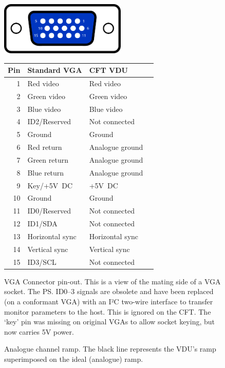 \begin{figure}
  \centering
  \includegraphics[width=6cm]{figs/DE15_Connector_Pinout.pdf}
  \vspace{1em}\par

  \zebra
  \begin{tabular}{rlll}
    Pin & Standard VGA & CFT VDU \\
    \hline
    1  & Red video & Red video \\
    2  & Green video & Green video \\
    3  & Blue video & Blue video \\
    4  & ID2/Reserved & Not connected \\
    5  & Ground & Ground \\
    6  & Red return & Analogue ground \\
    7  & Green return & Analogue ground \\
    8  & Blue return & Analogue ground \\
    9  & Key/+5V~DC & +5V~DC \\
    10 & Ground & Ground \\
    11 & ID0/Reserved & Not connected \\
    12 & ID1/SDA & Not connected \\
    13 & Horizontal sync & Horizontal sync \\
    14 & Vertical sync & Vertical sync \\
    15 & ID3/SCL & Not connected \\
    \hline
  \end{tabular}
  \caption[VGA Connector Pin-Out]{\label{fig:vdu-vga-pinout}VGA Connector
    pin-out. This is a view of the mating side of a VGA socket. The \ps{ID0–3}
    signals are obsolete and have been replaced (on a conformant VGA) with an
    I²C two-wire interface to transfer monitor parameters to the host. This is
    ignored on the CFT. The ‘key’ pin was missing on original VGAs to allow
    socket keying, but now carries 5V power.}
\end{figure}

\begin{figure}
 \centering
 
 \caption[Analogue Channel Ramp]{\label{fig:vdu-analogue-ramp} Analogue channel
   ramp. The black line represents the VDU's ramp superimposed on the ideal
   (analogue) ramp.}
\end{figure}


